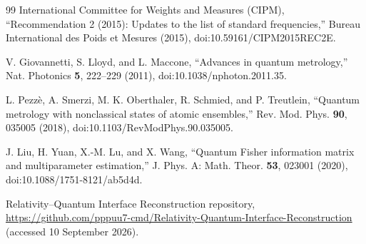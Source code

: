 \begin{thebibliography}{99}
International Committee for Weights and Measures (CIPM),
``Recommendation 2 (2015): Updates to the list of standard frequencies,''
Bureau International des Poids et Mesures (2015),
doi:10.59161/CIPM2015REC2E.

V. Giovannetti, S. Lloyd, and L. Maccone,
``Advances in quantum metrology,''
Nat. Photonics \textbf{5}, 222--229 (2011),
doi:10.1038/nphoton.2011.35.

L. Pezz\`e, A. Smerzi, M. K. Oberthaler, R. Schmied, and P. Treutlein,
``Quantum metrology with nonclassical states of atomic ensembles,''
Rev. Mod. Phys. \textbf{90}, 035005 (2018),
doi:10.1103/RevModPhys.90.035005.

J. Liu, H. Yuan, X.-M. Lu, and X. Wang,
``Quantum Fisher information matrix and multiparameter estimation,''
J. Phys. A: Math. Theor. \textbf{53}, 023001 (2020),
doi:10.1088/1751-8121/ab5d4d.

Relativity--Quantum Interface Reconstruction repository,
\url{https://github.com/pppuu7-cmd/Relativity-Quantum-Interface-Reconstruction}
(accessed 10 September 2026).

\end{thebibliography}
